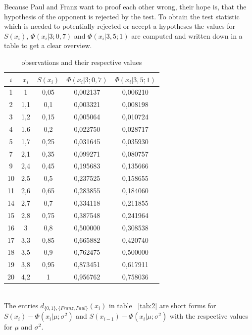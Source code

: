 \documentclass{article}
\begin{document}
Because Paul and Franz want to proof each other wrong, their hope is, that the hypothesis of the opponent is rejected by the test.
To obtain the test statistic which is needed to potentially rejected or accept a hypotheses the values for $S(x_i)$, $\Phi (x_i|3;0,7)$ and $\Phi (x_i|3,5;1)$ are computed and written down in a table to get a clear overview.
\begin{table}[ht]
\caption{observations and their respective values}
\center
\begin{tabular}{c|c|c|c|c}
\label{tab:1}
$i$ 	& $x_i$ 	& $S(x_i)$ 	& $\Phi (x_i|3;0,7)$ 	& $\Phi (x_i|3,5;1)$ 	\\
\hline
1	&	1	&	0,05	&	0,002137	&	0,006210	\\
2	&	1,1	&	0,1	&	0,003321	&	0,008198	\\
3	&	1,2	&	0,15	&	0,005064	&	0,010724	\\
4	&	1,6	&	0,2	&	0,022750	&	0,028717	\\
5	&	1,7	&	0,25	&	0,031645	&	0,035930	\\
7	&	2,1	&	0,35	&	0,099271	&	0,080757	\\
9	&	2,4	&	0,45	&	0,195683	&	0,135666	\\
10	&	2,5	&	0,5	&	0,237525	&	0,158655	\\
11	&	2,6	&	0,65	&	0,283855	&	0,184060	\\
14	&	2,7	&	0,7	&	0,334118	&	0,211855	\\
15	&	2,8	&	0,75	&	0,387548	&	0,241964	\\
16	&	3	&	0,8	&	0,500000	&	0,308538	\\
17	&	3,3	&	0,85	&	0,665882	&	0,420740	\\
18	&	3,5	&	0,9	&	0,762475	&	0,500000	\\
19	&	3,8	&	0,95	&	0,873451	&	0,617911	\\
20	&	4,2	&	1	&	0,956762	&	0,758036	\\
\end{tabular}
\end{table}
\\
The entries $d_{\{0,1\},\{Franz,Paul\}}(x_i)$ in table ~\ref{tab:2} are short forms for $S(x_i)-\Phi (x_i|\mu ;\sigma^2)$ and $S(x_{i-1})-\Phi (x_i|\mu;\sigma^2)$ with the respective values for $\mu$ and $\sigma^2$.\\
\end{document}
